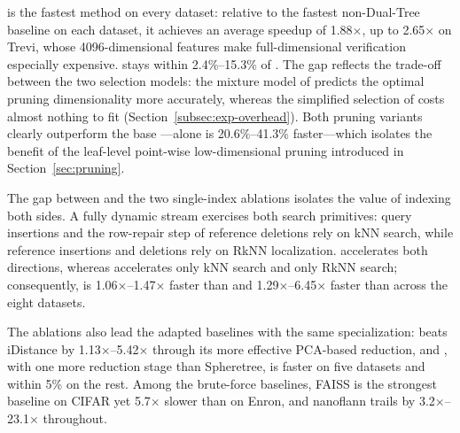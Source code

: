 \dualtreeopt is the fastest method on every dataset: relative to the fastest non-Dual-Tree baseline on each dataset, it achieves an average speedup of 1.88$\times$, up to 2.65$\times$ on Trevi, whose 4096-dimensional features make full-dimensional verification especially expensive. \dualtreefast stays within 2.4\%--15.3\% of \dualtreeopt. The gap reflects the trade-off between the two selection models: the mixture model of \dualtreeopt predicts the optimal pruning dimensionality more accurately, whereas the simplified selection of \dualtreefast costs almost nothing to fit (Section~\ref{subsec:exp-overhead}). Both pruning variants clearly outperform the base \dualtree---\dualtreefast alone is 20.6\%--41.3\% faster---which isolates the benefit of the leaf-level point-wise low-dimensional pruning introduced in Section~\ref{sec:pruning}.

The gap between \dualtree and the two single-index ablations isolates the value of indexing both sides. A fully dynamic stream exercises both search primitives: query insertions and the row-repair step of reference deletions rely on kNN search, while reference insertions and deletions rely on RkNN localization. \dualtree accelerates both directions, whereas \deltatree accelerates only kNN search and \hdrtree only RkNN search; consequently, \dualtree is 1.06$\times$--1.47$\times$ faster than \deltatree and 1.29$\times$--6.45$\times$ faster than \hdrtree across the eight datasets.

The ablations also lead the adapted baselines with the same specialization: \deltatree beats iDistance by 1.13$\times$--5.42$\times$ through its more effective PCA-based reduction, and \hdrtree, with one more reduction stage than Spheretree, is faster on five datasets and within 5\% on the rest. Among the brute-force baselines, FAISS is the strongest baseline on CIFAR yet 5.7$\times$ slower than \dualtreeopt on Enron, and nanoflann trails \dualtreeopt by 3.2$\times$--23.1$\times$ throughout.

